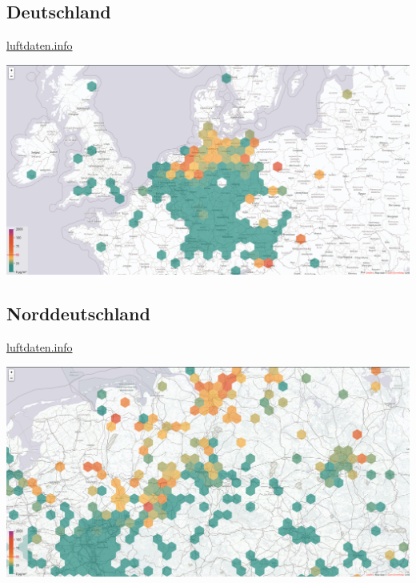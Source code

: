 \documentclass[aspectratio=169]{beamer} %
\begin{document}
\subsection{Deutschland}
\begin{frame}{\href{http://hannover.maps.luftdaten.info/\#6/52.373/10.005}{luftdaten.info}}
  \begin{center}
    \includegraphics[width=\textwidth]{../screenshots/luftdaten-zoom-f.png}
  \end{center}
\end{frame}
\subsection{Norddeutschland}
\begin{frame}{\href{http://hannover.maps.luftdaten.info/\#8/52.373/10.005}{luftdaten.info}}
  \begin{center}
    \includegraphics[width=\textwidth]{../screenshots/luftdaten-zoom-d.png}
  \end{center}
\end{frame}
\end{document}
